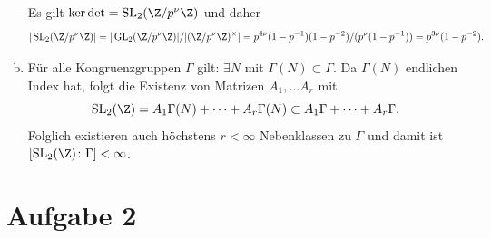 \documentclass{article}
\begin{document}
\begin{enumerate}[(a)]
\[    \]
    Es gilt $\ker \det = \operatorname{SL}_2(\Z/p^\nu \Z)$ und daher
    \[
        |\operatorname{SL}_2(\Z/p^\nu \Z)| = |\operatorname{GL}_2(\Z/p^\nu \Z)| / |(\Z/p^\nu\Z)^\times| = p^{4\nu}(1-p^{-1})(1 - p^{-2})/(p^\nu (1 - p^{-1})) = p^{3\nu}(1- p^{-2}).
    \]
    \item Für alle Kongruenzgruppen $\Gamma$ gilt: $\exists N$ mit $\Gamma(N) \subset \Gamma$. Da $\Gamma(N)$ endlichen Index hat, folgt die Existenz von Matrizen $A_1, \dots A_r$ mit 
    \[
        \operatorname{SL}_2(\Z) = A_1 \Gamma(N) + \dots + A_r \Gamma(N) \subset A_1 \Gamma + \dots + A_r \Gamma.
    \]
    Folglich existieren auch höchstens $r < \infty$ Nebenklassen zu $\Gamma$ und damit ist $[\operatorname{SL}_2(\Z) \colon \Gamma] < \infty$.
\end{enumerate}
\section*{Aufgabe 2}
\end{document}

